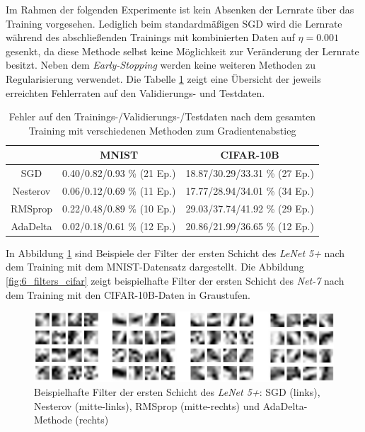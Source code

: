 Im Rahmen der folgenden Experimente ist kein Absenken der Lernrate über das Training vorgesehen. Lediglich beim standardmäßigen SGD wird die Lernrate während des abschließenden Trainings mit kombinierten Daten auf $\eta = 0.001$ gesenkt, da diese Methode selbst keine Möglichkeit zur Veränderung der Lernrate besitzt. Neben dem \textit{Early-Stopping} werden keine weiteren Methoden zu Regularisierung verwendet. Die Tabelle \ref{tab:6_gradientdescent} zeigt eine Übersicht der jeweils erreichten Fehlerraten auf den Validierungs- und Testdaten.


\begin{table}
\centering
\begin{tabular}{c|c|c}
 	 			&   MNIST							& CIFAR-10B						 		\\ 
\hline SGD		&  0.40/0.82/0.93 \% (21 Ep.)	&	18.87/30.29/33.31 \% (27 Ep.)		\\
\hline Nesterov &  0.06/0.12/0.69 \% (11 Ep.)	&	17.77/28.94/34.01 \% (34 Ep.)				\\
\hline RMSprop  &  0.22/0.48/0.89 \% (10 Ep.)	&	29.03/37.74/41.92 \% (29 Ep.)				\\
\hline AdaDelta &  0.02/0.18/0.61 \% (12 Ep.)	&	20.86/21.99/36.65 \% (12 Ep.)				\\

\end{tabular} 
\caption{Fehler auf den Trainings-/Validierungs-/Testdaten nach dem gesamten Training mit verschiedenen Methoden zum Gradientenabstieg}
\label{tab:6_gradientdescent}
\end{table}

In Abbildung \ref{fig:6_filters_mnist} sind Beispiele der Filter der ersten Schicht des \textit{LeNet 5+} nach dem Training mit dem MNIST-Datensatz dargestellt. Die Abbildung \ref{fig:6_filters_cifar} zeigt beispielhafte Filter der ersten Schicht des \textit{Net-7} nach dem Training mit den CIFAR-10B-Daten in Graustufen.

\begin{figure}
\centering
\includegraphics[width=0.7\linewidth]{images/6_filters_mnist}
\caption[]{Beispielhafte Filter der ersten Schicht des \textit{LeNet 5+}: SGD (links), Nesterov (mitte-links), RMSprop (mitte-rechts) und AdaDelta-Methode (rechts)}
\label{fig:6_filters_mnist}
\end{figure}


